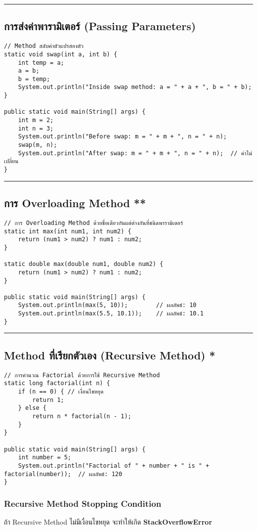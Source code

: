 \documentclass[11pt]{article}
\begin{document}
\noindent\rule{\textwidth}{0.5pt}
\subsection{การส่งค่าพารามิเตอร์ (Passing Parameters)}
\label{sec:org0b8197f}
\begin{verbatim}
// Method สลับค่าตัวแปรสองตัว
static void swap(int a, int b) {
    int temp = a;
    a = b;
    b = temp;
    System.out.println("Inside swap method: a = " + a + ", b = " + b);
}

public static void main(String[] args) {
    int m = 2;
    int n = 3;
    System.out.println("Before swap: m = " + m + ", n = " + n);
    swap(m, n);
    System.out.println("After swap: m = " + m + ", n = " + n);  // ค่าไม่เปลี่ยน
}
\end{verbatim}

\noindent\rule{\textwidth}{0.5pt}
\subsection{การ Overloading Method **}
\label{sec:orgdfca0f6}
\begin{verbatim}
// การ Overloading Method ด้วยชื่อเดียวกันแต่ต่างกันที่ชนิดพารามิเตอร์
static int max(int num1, int num2) {
    return (num1 > num2) ? num1 : num2;
}

static double max(double num1, double num2) {
    return (num1 > num2) ? num1 : num2;
}

public static void main(String[] args) {
    System.out.println(max(5, 10));        // ผลลัพธ์: 10
    System.out.println(max(5.5, 10.1));    // ผลลัพธ์: 10.1
}
\end{verbatim}

\noindent\rule{\textwidth}{0.5pt}
\subsection{Method ที่เรียกตัวเอง (Recursive Method) \textbf{*}}
\label{sec:orgdeda434}
\begin{verbatim}
// การคำนวณ Factorial ด้วยการใช้ Recursive Method
static long factorial(int n) {
    if (n == 0) { // เงื่อนไขหยุด
        return 1;
    } else {
        return n * factorial(n - 1);
    }
}

public static void main(String[] args) {
    int number = 5;
    System.out.println("Factorial of " + number + " is " + factorial(number));  // ผลลัพธ์: 120
}
\end{verbatim}
\subsubsection{Recursive Method Stopping Condition}
\label{sec:orge769fac}
ถ้า Recursive Method ไม่มีเงื่อนไขหยุด จะทำให้เกิด \textbf{StackOverflowError}
\end{document}
